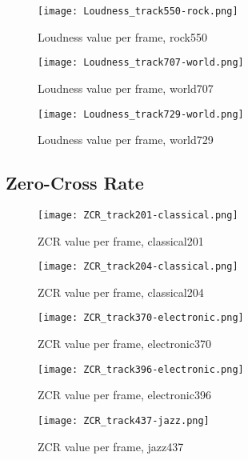 \documentclass{article} %
\begin{document}
\begin{figure}
\centering
\texttt{[image: Loudness\_track550-rock.png]}
\caption{Loudness value per frame, rock550}
\label{fig:loudness_550}
\end{figure}


\begin{figure}
\centering
\texttt{[image: Loudness\_track707-world.png]}
\caption{Loudness value per frame, world707}
\label{fig:loudness_707}
\end{figure}


\begin{figure}[h!]
\centering
\texttt{[image: Loudness\_track729-world.png]}
\caption{Loudness value per frame, world729}
\label{fig:loudness_729}
\end{figure}

\clearpage
\subsection{Zero-Cross Rate}
\label{sec:ZCRFigures}

\begin{figure}[ht!]
\centering
\texttt{[image: ZCR\_track201-classical.png]}
\caption{ZCR value per frame, classical201}
\label{fig:ZCR_201}
\end{figure}

\begin{figure}[!hb]
\centering
\texttt{[image: ZCR\_track204-classical.png]}
\caption{ZCR value per frame, classical204}
\label{fig:ZCR_204}
\end{figure}

\begin{figure}
\centering
\texttt{[image: ZCR\_track370-electronic.png]}
\caption{ZCR value per frame, electronic370}
\label{fig:ZCR_370}
\end{figure}

\begin{figure}
\centering
\texttt{[image: ZCR\_track396-electronic.png]}
\caption{ZCR value per frame, electronic396}
\label{fig:ZCR_396}
\end{figure}

\begin{figure}
\centering
\texttt{[image: ZCR\_track437-jazz.png]}
\caption{ZCR value per frame, jazz437}
\label{fig:ZCR_437}
\end{figure}
\end{document}
